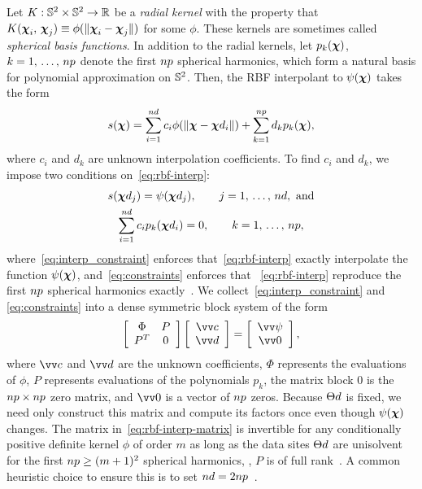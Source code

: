 Let $K:\mathbb{S}^2\times\mathbb{S}^2\to\mathbb{R}$ be a \emph{radial kernel} with the property that
$K(\boldsymbol{\chi}_i,\,\boldsymbol{\chi}_j)\equiv\phi(\|\boldsymbol{\chi}_i-\boldsymbol{\chi}_j\|)$ for some $\phi$. These kernels are
sometimes called \emph{spherical basis functions}. In addition to the radial kernels, let
$p_k(\boldsymbol{\chi})$, $k=1,\,\ldots,\,\poly\cardinality$ denote the first $\poly\cardinality$
spherical harmonics, which form a natural basis for polynomial approximation on
$\mathbb{S}^2$. Then, the RBF interpolant to $\psi(\boldsymbol{\chi})$ takes the form
\begin{equation}\label{eq:rbf-interp}
    s(\Xp)
    = \sum_{i=1}^{\data\cardinality} c_i \phi(\|\Xp-\data\Xp_i\|)
    + \sum_{k=1}^{\poly\cardinality} d_k p_k(\Xp),
\end{equation}
where $c_i$ and $d_k$ are unknown interpolation coefficients. To find $c_i$ and $d_k$, we
impose two conditions on~\eqref{eq:rbf-interp}:
\begin{gather}
    s(\data\Xp_j) = \psi(\data\Xp_j), \qquad j=1,\,\ldots,\,\data\cardinality,~\text{and} \label{eq:interp_constraint} \\
    \sum_{i=1}^{\data\cardinality} c_i p_k(\data\Xp_i) = 0, \qquad k=1,\,\ldots,\,\poly\cardinality, \label{eq:constraints}
\end{gather}
where~\eqref{eq:interp_constraint} enforces that~\eqref{eq:rbf-interp} exactly
interpolate the function $\psi(\boldsymbol{\chi})$, and~\eqref{eq:constraints} enforces that~%
\eqref{eq:rbf-interp} reproduce the first $\poly\cardinality$ spherical harmonics
exactly~\cite{Fasshauer:2007ui}. We collect~\eqref{eq:interp_constraint} and~%
\eqref{eq:constraints} into a dense symmetric block system of the form
\begin{equation}\label{eq:rbf-interp-matrix}
    \left[\begin{array}{cc}
            \Phi & P \\ P^T & 0
    \end{array}\right]\left[\begin{array}{c}
            \arr{c} \\ \arr{d}
    \end{array}\right] = \left[\begin{array}{c}
            \arr{\psi} \\ \arr{0}
    \end{array}\right],
\end{equation}
where $\arr{c}$ and $\arr{d}$ are the unknown coefficients, $\Phi$ represents the
evaluations of $\phi$, $P$ represents evaluations of the polynomials $p_k$, the matrix
block $0$ is the $\poly\cardinality\times\poly\cardinality$ zero matrix, and $\arr{0}$ is
a vector of $\poly\cardinality$ zeros. Because $\data\sites$ is fixed, we need only
construct this matrix and compute its factors once even though $\psi(\boldsymbol{\chi})$ changes. The
matrix in~\eqref{eq:rbf-interp-matrix} is invertible for any conditionally positive
definite kernel $\phi$ of order $m$ as long as the data sites $\data\sites$ are
unisolvent for the first $\poly\cardinality \ge (m+1)^2$ spherical harmonics,
, $P$ is of full rank~\cite{Fasshauer:2007ui}. A common heuristic choice to
ensure this is to set $\data\cardinality = 2 \poly\cardinality$~\cite{SWJCP2018}. 

